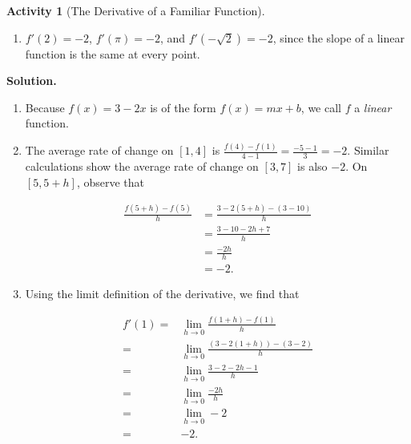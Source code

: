 \documentclass[10pt,]{book}
\theoremstyle{plain}
\theoremstyle{definition}
\theoremstyle{definition}
\theoremstyle{definition}
\theoremstyle{definition}
\newtheorem{activity}[project]{Activity}
\theoremstyle{definition}
\numberwithin{equation}{section}
\newcommand{\amp}{ & }
\begin{document}
\begin{activity}[The Derivative of a Familiar Function]
\begin{enumerate}[label=\alph*]
\item\hypertarget{li-136}{}\(f'(2)=-2\), \(f'(\pi)=-2\), and \(f'(-\sqrt{2})=-2\), since the slope of a linear function is the same at every point.%
\end{enumerate}
\par\medskip\noindent%
\textbf{Solution.}\quad \leavevmode%
\begin{enumerate}[label=\alph*]
\item\hypertarget{li-137}{}Because \(f(x) = 3 - 2x\) is of the form \(f(x) = mx + b\), we call \(f\) a \emph{linear} function.%
\item\hypertarget{li-138}{}The average rate of change on \([1,4]\) is \(\frac{f(4)-f(1)}{4-1} = \frac{-5 - 1}{3} = -2\).  Similar calculations show the average rate of change on \([3,7]\) is also \(-2\).  On \([5,5+h]\), observe that 
            
            \begin{align*}
\frac{f(5+h)-f(5)}{h} \amp = \frac{3-2(5+h) - (3-10)}{h}\\
                      \amp = \frac{3 - 10 - 2h + 7}{h}\\
                      \amp = \frac{-2h}{h} \\
                      \amp = -2.
\end{align*}%
\item\hypertarget{li-139}{}Using the limit definition of the derivative, we find that
            
            \begin{align*}
f'(1) = \amp  \lim_{h \to 0} \frac{f(1+h) - f(1)}{h}\\
         = \amp  \lim_{h \to 0} \frac{(3 - 2(1+h)) - (3-2)}{h}\\
         = \amp  \lim_{h \to 0} \frac{3 - 2 - 2h - 1}{h}\\
         = \amp  \lim_{h \to 0} \frac{-2h}{h}\\
         = \amp  \lim_{h \to 0} -2\\
         = \amp  -2.
\end{align*}%
\end{enumerate}
\end{activity}
\end{document}
